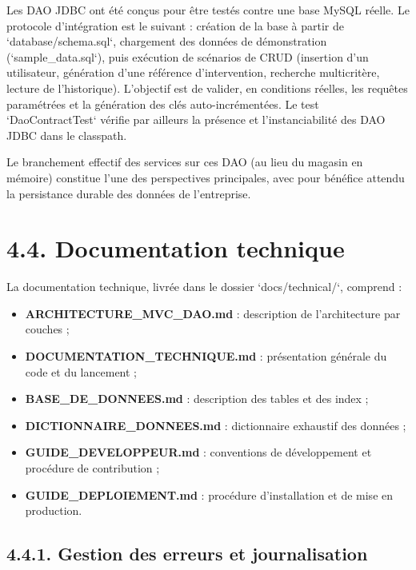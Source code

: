 \documentclass[11pt,a4paper]{report}
\begin{document}
Les DAO JDBC ont été conçus pour être testés contre une base MySQL réelle. Le protocole d'intégration est le suivant : création de la base à partir de `database/schema.sql`, chargement des données de démonstration (`sample\_data.sql`), puis exécution de scénarios de CRUD (insertion d'un utilisateur, génération d'une référence d'intervention, recherche multicritère, lecture de l'historique). L'objectif est de valider, en conditions réelles, les requêtes paramétrées et la génération des clés auto-incrémentées. Le test `DaoContractTest` vérifie par ailleurs la présence et l'instanciabilité des DAO JDBC dans le classpath.

Le branchement effectif des services sur ces DAO (au lieu du magasin en mémoire) constitue l'une des perspectives principales, avec pour bénéfice attendu la persistance durable des données de l'entreprise.
\section*{4.4. Documentation technique}

La documentation technique, livrée dans le dossier `docs/technical/`, comprend :
\begin{itemize}
  \item \textbf{ARCHITECTURE\_MVC\_DAO.md} : description de l'architecture par couches ;
  \item \textbf{DOCUMENTATION\_TECHNIQUE.md} : présentation générale du code et du lancement ;
  \item \textbf{BASE\_DE\_DONNEES.md} : description des tables et des index ;
  \item \textbf{DICTIONNAIRE\_DONNEES.md} : dictionnaire exhaustif des données ;
  \item \textbf{GUIDE\_DEVELOPPEUR.md} : conventions de développement et procédure de contribution ;
  \item \textbf{GUIDE\_DEPLOIEMENT.md} : procédure d'installation et de mise en production.
\end{itemize}
\subsection*{4.4.1. Gestion des erreurs et journalisation}
\end{document}
